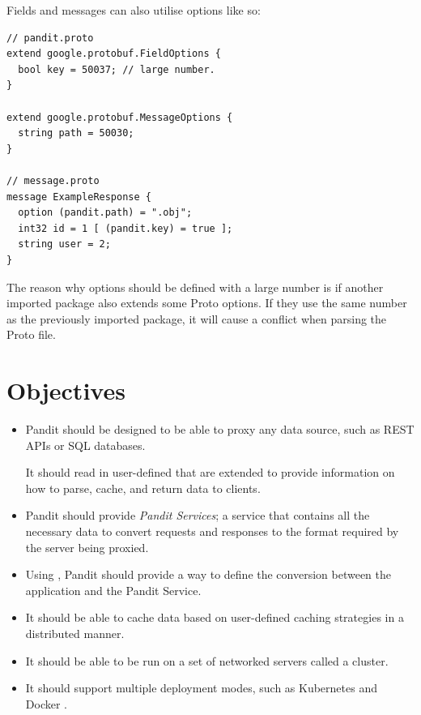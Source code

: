 \documentclass[a4paper,12pt]{report}
\begin{document}
Fields and messages can also utilise options like so:

\begin{lstlisting}
// pandit.proto
extend google.protobuf.FieldOptions {
  bool key = 50037; // large number.
}

extend google.protobuf.MessageOptions { 
  string path = 50030; 
}

// message.proto
message ExampleResponse {
  option (pandit.path) = ".obj";
  int32 id = 1 [ (pandit.key) = true ];
  string user = 2;
}
\end{lstlisting}

The reason why options should be defined with a large number is if another imported package also extends some Proto options. If they use the same
number as the previously imported package, it will cause a conflict when parsing the Proto file.

\section{Objectives}
\label{sec:objectives}

\begin{itemize}
    \item Pandit should be designed to be able to proxy any data source, such as REST APIs or SQL databases.
    
    It should read in user-defined  that are extended to provide information on how to parse, cache, and return data to clients.
    
    \item Pandit should provide \textit{Pandit Services}; a  service that contains all the necessary data to convert requests and responses to the format required by the server being proxied.
    
    \item Using , Pandit should provide a way to define the conversion between the application and the Pandit Service.
    
    \item It should be able to cache data based on user-defined caching strategies in a distributed manner.
    
    \item It should be able to be run on a set of networked servers called a cluster.
    
    \item It should support multiple deployment modes, such as Kubernetes \cite{k8s} and Docker \cite{docker}.
\end{itemize}
\end{document}
